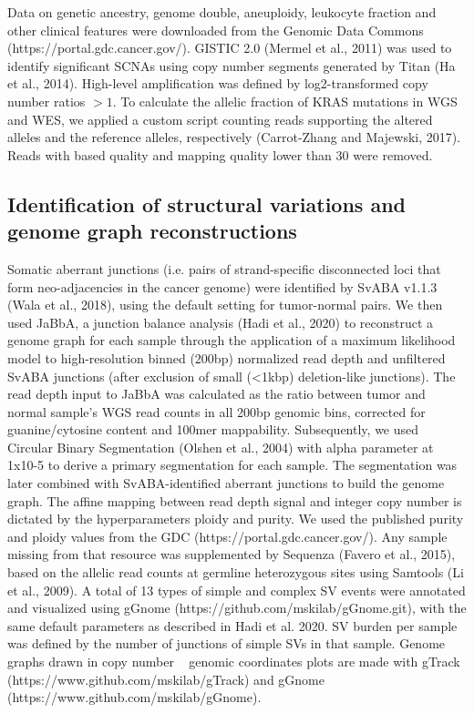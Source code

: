 \documentclass[phd,tocprelim]{cornell}
\begin{document}
Data on genetic ancestry, genome double, aneuploidy, leukocyte fraction and other clinical features were downloaded from the Genomic Data Commons (https://portal.gdc.cancer.gov/). GISTIC 2.0 (Mermel et al., 2011) was used to identify significant SCNAs using copy number segments generated by Titan (Ha et al., 2014). High-level amplification was defined by log2-transformed copy number ratios $>1$. To calculate the allelic fraction of KRAS mutations in WGS and WES, we applied a custom script counting reads supporting the altered alleles and the reference alleles, respectively (Carrot-Zhang and Majewski, 2017). Reads with based quality and mapping quality lower than 30 were removed.

\subsection*{Identification of structural variations and genome graph reconstructions}
Somatic aberrant junctions (i.e. pairs of strand-specific disconnected loci that form neo-adjacencies in the cancer genome) were identified by SvABA v1.1.3 (Wala et al., 2018), using the default setting for tumor-normal pairs. We then used JaBbA, a junction balance analysis (Hadi et al., 2020) to reconstruct a genome graph for each sample through the application of a maximum likelihood model to high-resolution binned (200bp) normalized read depth and unfiltered SvABA junctions (after exclusion of small (<1kbp) deletion-like junctions). The read depth input to JaBbA was calculated as the ratio between tumor and normal sample’s WGS read counts in all 200bp genomic bins, corrected for guanine/cytosine content and 100mer mappability. Subsequently, we used Circular Binary Segmentation (Olshen et al., 2004) with alpha parameter at 1x10-5 to derive a primary segmentation for each sample. The segmentation was later combined with SvABA-identified aberrant junctions to build the genome graph. The affine mapping between read depth signal and integer copy number is dictated by the hyperparameters ploidy and purity. We used the published purity and ploidy values from the GDC (https://portal.gdc.cancer.gov/). Any sample missing from that resource was supplemented by Sequenza (Favero et al., 2015), based on the allelic read counts at germline heterozygous sites using Samtools (Li et al., 2009). A total of 13 types of simple and complex SV events were annotated and visualized using gGnome (https://github.com/mskilab/gGnome.git), with the same default parameters as described in Hadi et al. 2020. SV burden per sample was defined by the number of junctions of simple SVs in that sample. Genome graphs drawn in copy number ~ genomic coordinates plots are made with gTrack (https://www.github.com/mskilab/gTrack) and gGnome (https://www.github.com/mskilab/gGnome). 
\end{document}

